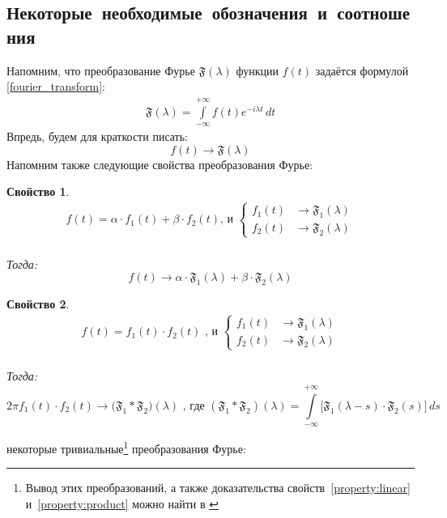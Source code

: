 \documentclass[11pt, oneside, final]{article}
\theoremstyle{break}
\numberwithin{equation}{section}
\theoremstyle{plain}
\newtheorem{property}{Свойство}[section]
\theoremstyle{definition}
\newcommand \four[1][\lambda]{\mathfrak{F}(#1)}
\newcommand \rarrow{\rightarrow}
\newcommand \intinf[1][{\,dt}]{ \int\limits_{-\infty}^{+\infty}{{#1}}}
\begin{document}
       \subsection{Некоторые~необходимые~обозначения~и~соотношения}
       Напомним, что преобразование Фурье \( \four \) функции \(f(t)\) задаётся формулой \eqref{fourier_transform}: 
       \begin{align*}
           \four = \intinf[ {f(t) e^{-i\lambda t}\, dt}] 
       \end{align*}
       Впредь, будем для краткости писать:
       \[ \boxed{ f(t)\rarrow\four} \]
       Напомним также следующие свойства преобразования Фурье:
       \begin{property}\label{property:linear} 
           \begin{gather*}
               f(t) = \alpha \cdot f_1(t) + \beta \cdot f_2(t) \text{, и } \left\{ 
               \begin{aligned}
                   f_1(t) &\rarrow \mathfrak{F_1}(\lambda) \\
                   f_2(t) &\rarrow \mathfrak{F_2}(\lambda) 
               \end{aligned}
               \right. 
           \end{gather*}
           \\
           Тогда:
           \[ f(t) \rarrow \alpha \cdot \mathfrak{F_1}(\lambda) + \beta \cdot \mathfrak{F_2}(\lambda) \]
       \end{property}
       \begin{property}\label{property:product} 
           \begin{gather*}
               f(t) = f_1(t) \cdot f_2(t) \text{ , и } \left\{ 
               \begin{aligned}
                   f_1(t) &\rarrow \mathfrak{F_1}(\lambda) \\
                   f_2(t) &\rarrow \mathfrak{F_2}(\lambda) 
               \end{aligned}
               \right. 
           \end{gather*}
           \\
           Тогда:
           \[ 2\pi f_1(t) \cdot f_2(t) \rarrow (\mathfrak{F_1 * F_2)}(\lambda) \text{ , где }(\mathfrak{F_1 * F_2})(\lambda) = \intinf[{\bigl[\mathfrak{F_1}(\lambda - s) \cdot \mathfrak{F_2}(s)\bigr] \, ds}] \]
       \end{property}
        некоторые тривиальные\footnote{Вывод этих преобразований, а также доказательства свойств~\eqref{property:linear} и~\eqref{property:product} можно найти в \cite{Roublev:fourier}} преобразования Фурье: 
\end{document}
